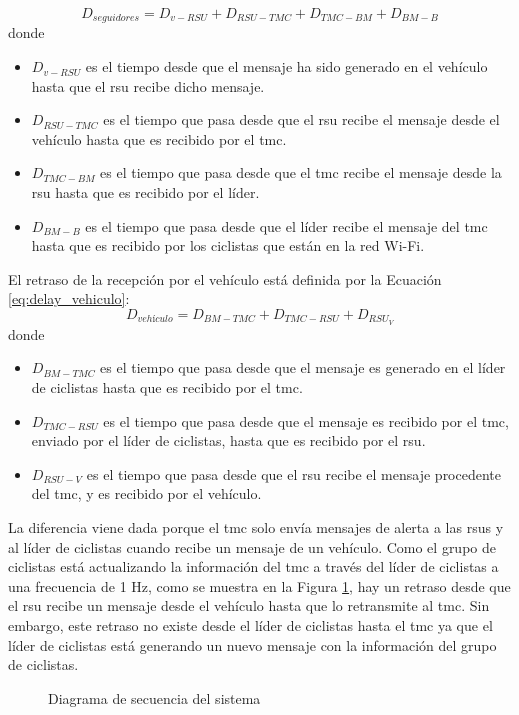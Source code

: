 \begin{equation}\label{eq:delay_seguidores}
D_{seguidores} = D_{v-RSU} + D_{RSU-TMC} + D_{TMC-BM} + D_{BM-B}
\end{equation}
donde
\begin{itemize}
	\item $D_{v-RSU}$ es el tiempo desde que el mensaje ha sido generado en el
	vehículo hasta que el \gls{rsu} recibe dicho mensaje.

	\item $D_{RSU-TMC}$ es el tiempo que pasa desde que el \gls{rsu} recibe el
	mensaje desde el vehículo hasta que es recibido por el \gls{tmc}.

	\item $D_{TMC-BM}$ es el tiempo que pasa desde que el \gls{tmc} recibe el
	mensaje desde la \gls{rsu} hasta que es recibido por el líder.

	\item $D_{BM-B}$ es el tiempo que pasa desde que el líder recibe el mensaje
	del \gls{tmc} hasta que es recibido por los ciclistas que están en la red
	Wi-Fi.
\end{itemize}

El retraso de la recepción por el vehículo está definida por la Ecuación
\ref{eq:delay_vehiculo}:
\begin{equation}\label{eq:delay_vehiculo}
D_{vehículo} = D_{BM-TMC} + D_{TMC-RSU} + D_{RSU_V}
\end{equation}
donde
\begin{itemize}
	\item $D_{BM-TMC}$ es el tiempo que pasa desde que el mensaje es generado en
	el líder de ciclistas hasta que es recibido por el \gls{tmc}.

	\item $D_{TMC-RSU}$ es el tiempo que pasa desde que el mensaje es recibido
	por el \gls{tmc}, enviado por el líder de ciclistas, hasta que es recibido
	por el \gls{rsu}.

	\item $D_{RSU-V}$ es el tiempo que pasa desde que el \gls{rsu} recibe el
	mensaje procedente del \gls{tmc}, y es recibido por el vehículo.
\end{itemize}

La diferencia viene dada porque el \gls{tmc} solo envía mensajes de alerta a
las \gls{rsu}s y al líder de ciclistas cuando recibe un mensaje de un vehículo.
Como el grupo de ciclistas está actualizando la información del \gls{tmc} a
través del líder de ciclistas a una frecuencia de 1 Hz, como se muestra en la
Figura \ref{fig:simulacion-diagrama-secuencia}, hay un retraso desde que el
\gls{rsu} recibe un mensaje desde el vehículo hasta que lo retransmite al
\gls{tmc}. Sin embargo, este retraso no existe desde el líder de ciclistas
hasta el \gls{tmc} ya que el líder de ciclistas está generando un nuevo mensaje
con la información del grupo de ciclistas.


\begin{figure}[h]
	\begin{center}
	\end{center}
	\caption{Diagrama de secuencia del sistema}
	\label{fig:simulacion-diagrama-secuencia}
\end{figure}

